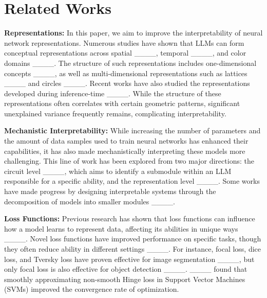 \section{Related Works}
\label{sec:related-works}

{\bf Representations:} In this paper, we aim to improve the interpretability of neural network representations. Numerous studies have shown that LLMs can form conceptual representations across spatial ____, temporal ____, and color domains ____. The structure of such representations includes one-dimensional concepts ____, as well as multi-dimensional representations such as lattices ____ and circles ____. Recent works have also studied the representations developed during inference-time ____. While the structure of these representations often correlates with certain geometric patterns, significant unexplained variance frequently remains, complicating interpretability.

{\bf Mechanistic Interpretability:}  While increasing the number of parameters and the amount of data samples used to train neural networks has enhanced their capabilities, it has also made mechanistically interpreting these models more challenging. This line of work has been explored from two major directions: the circuit level ____, which aims to identify a submodule within an LLM responsible for a specific ability, and the representation level ____. 
Some works have made progress by designing interpretable systems through the decomposition of models into smaller modules ____.

{\bf Loss Functions:}  Previous research has shown that loss functions can influence how a model learns to represent data, affecting its abilities in unique ways ____. Novel loss functions have improved performance on specific tasks, though they often reduce ability in different settings ____. For instance, focal loss, dice loss, and Tversky loss have proven effective for image segmentation ____, but only focal loss is also effective for object detection ____. ____ found that smoothly approximating non-smooth Hinge loss in Support Vector Machines (SVMs) improved the convergence rate of optimization.


